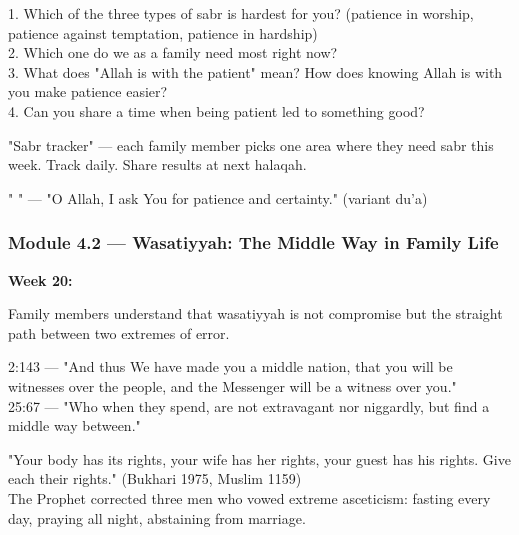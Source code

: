 \documentclass[11pt,a4paper]{article}
\begin{document}
\begin{discussionbox} 1. Which of the three types of sabr is hardest for you? (patience in worship, patience against temptation, patience in hardship) \\ 2. Which one do we as a family need most right now? \\ 3. What does "Allah is with the patient" mean? How does knowing Allah is with you make patience easier? \\ 4. Can you share a time when being patient led to something good? \end{discussionbox}

\begin{activitybox} "Sabr tracker" --- each family member picks one area where they need sabr this week. Track daily. Share results at next halaqah. \end{activitybox}

\begin{duabox} "    " --- "O Allah, I ask You for patience and certainty." (variant du'a) \end{duabox}

\vspace{6pt}\noindent{\color{border}\rule{\textwidth}{0.5pt}}\vspace{6pt}

\subsubsection*{Module 4.2 --- Wasatiyyah: The Middle Way in Family Life}
\textbf{Week 20:} 

\begin{outcomebox} Family members understand that wasatiyyah is not compromise but the straight path between two extremes of error. \end{outcomebox}

\begin{quranbox} 2:143 --- "And thus We have made you a middle nation, that you will be witnesses over the people, and the Messenger will be a witness over you." \\ 25:67 --- "Who when they spend, are not extravagant nor niggardly, but find a middle way between." \end{quranbox}

\begin{hadithbox} "Your body has its rights, your wife has her rights, your guest has his rights. Give each their rights." (Bukhari 1975, Muslim 1159) \\ The Prophet corrected three men who vowed extreme asceticism: fasting every day, praying all night, abstaining from marriage. \end{hadithbox}
\end{document}
